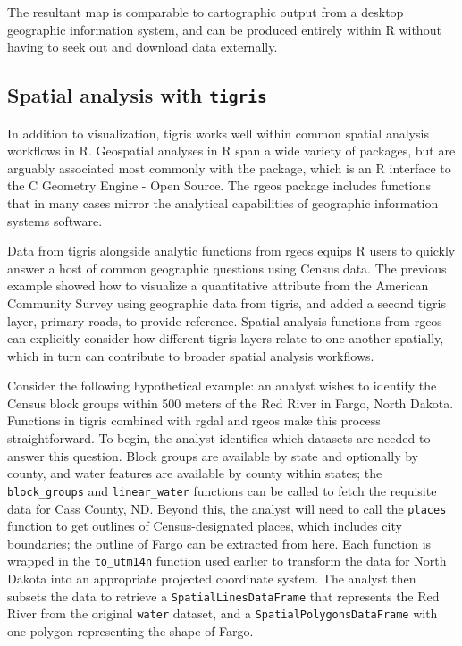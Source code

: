 The resultant map is comparable to cartographic output from a desktop
geographic information system, and can be produced entirely within R
without having to seek out and download data externally.

\subsection{\texorpdfstring{Spatial analysis with
\texttt{tigris}}{Spatial analysis with tigris}}\label{spatial-analysis-with-tigris}

In addition to visualization, tigris works well within common spatial
analysis workflows in R. Geospatial analyses in R span a wide variety of
packages, but are arguably associated most commonly with the
 package, which is an R interface to the C Geometry
Engine - Open Source. The rgeos package includes functions that in many
cases mirror the analytical capabilities of geographic information
systems software.

Data from tigris alongside analytic functions from rgeos equips R users
to quickly answer a host of common geographic questions using Census
data. The previous example showed how to visualize a quantitative
attribute from the American Community Survey using geographic data from
tigris, and added a second tigris layer, primary roads, to provide
reference. Spatial analysis functions from rgeos can explicitly consider
how different tigris layers relate to one another spatially, which in
turn can contribute to broader spatial analysis workflows.

Consider the following hypothetical example: an analyst wishes to
identify the Census block groups within 500 meters of the Red River in
Fargo, North Dakota. Functions in tigris combined with rgdal and rgeos
make this process straightforward. To begin, the analyst identifies
which datasets are needed to answer this question. Block groups are
available by state and optionally by county, and water features are
available by county within states; the \texttt{block\_groups} and
\texttt{linear\_water} functions can be called to fetch the requisite
data for Cass County, ND. Beyond this, the analyst will need to call the
\texttt{places} function to get outlines of Census-designated places,
which includes city boundaries; the outline of Fargo can be extracted
from here. Each function is wrapped in the \texttt{to\_utm14n} function
used earlier to transform the data for North Dakota into an appropriate
projected coordinate system. The analyst then subsets the data to
retrieve a \texttt{SpatialLinesDataFrame} that represents the Red River
from the original \texttt{water} dataset, and a
\texttt{SpatialPolygonsDataFrame} with one polygon representing the
shape of Fargo.


